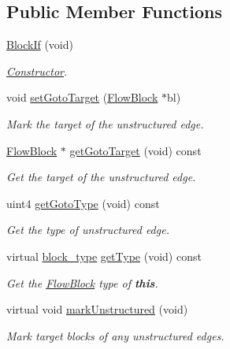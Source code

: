 \subsection*{Public Member Functions}
\begin{DoxyCompactItemize}
\item 
\mbox{\hyperlink{class_block_if_a6699014493d18a7da68acba2ecb37f3d}{Block\+If}} (void)
\begin{DoxyCompactList}\small\item\em \mbox{\hyperlink{class_constructor}{Constructor}}. \end{DoxyCompactList}\item 
void \mbox{\hyperlink{class_block_if_a1ae37af7491c4b9d397e6d488d5ce02b}{set\+Goto\+Target}} (\mbox{\hyperlink{class_flow_block}{Flow\+Block}} $\ast$bl)
\begin{DoxyCompactList}\small\item\em Mark the target of the unstructured edge. \end{DoxyCompactList}\item 
\mbox{\hyperlink{class_flow_block}{Flow\+Block}} $\ast$ \mbox{\hyperlink{class_block_if_a8fe6faa01ae8217df40b2e8a684339d7}{get\+Goto\+Target}} (void) const
\begin{DoxyCompactList}\small\item\em Get the target of the unstructured edge. \end{DoxyCompactList}\item 
uint4 \mbox{\hyperlink{class_block_if_ad40f9c4fe01ab64decea6915bf674442}{get\+Goto\+Type}} (void) const
\begin{DoxyCompactList}\small\item\em Get the type of unstructured edge. \end{DoxyCompactList}\item 
virtual \mbox{\hyperlink{class_flow_block_a70df78390870fcdd51e31426ba6a193e}{block\+\_\+type}} \mbox{\hyperlink{class_block_if_a6fb92878f6e42112610ac0dee44c63a9}{get\+Type}} (void) const
\begin{DoxyCompactList}\small\item\em Get the \mbox{\hyperlink{class_flow_block}{Flow\+Block}} type of {\bfseries{this}}. \end{DoxyCompactList}\item 
virtual void \mbox{\hyperlink{class_block_if_a7e394df8ba02a9ba48bd9ec239e84d52}{mark\+Unstructured}} (void)
\begin{DoxyCompactList}\small\item\em Mark target blocks of any unstructured edges. \end{DoxyCompactList}\item 

\end{DoxyCompactItemize}
